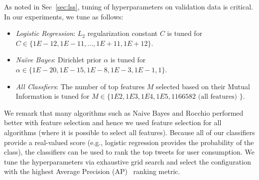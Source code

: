 As noted in Sec~\ref{sec:lss}, tuning of hyperparameters on validation
data is critical.  In our experiments, we tune as follows: %
\begin{itemize}
\item \textit{Logistic Regression}: $L_2$ regularization constant $C$ is tuned for $C \in \{1E-12, 1E-11, ..., 1E+11, 1E+12\}$.
\item \textit{Na\"{i}ve Bayes}: Dirichlet prior $\alpha$ is tuned for $\alpha \in \{1E-20, 1E-15, 1E-8, 1E-3, 1E-1, 1\}$.
\item \textit{All Classfiers}: The number of top features $M$ selected based on their Mutual Information is tuned for $M \in \{1E2, 1E3, 1E4, 1E5, 1166582 \textrm{ (all features) } \}$.
\end{itemize}
We remark that many algorithms such as Naive Bayes and Rocchio
performed better with feature selection and hence we used feature
selection for all algorithms (where it is possible to select all
features).  
Because all of our classifiers provide a real-valued score (e.g., logistic regression
provides the probability of the class), the classifiers can be used to rank the top tweets
for user consumption.  We tune the hyperparameters via exhaustive grid search
and select the configuration with the highest Average Precision
(AP)~\cite{manning_ir} ranking metric. %
%
%

